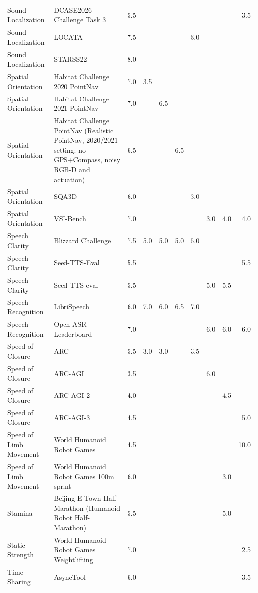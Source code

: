 \begin{longtable}{lp{4.6cm}rrrrrrrr}
Sound Localization & DCASE2026 Challenge Task 3 & 5.5 &  &  &  &  &  &  & 3.5 \\
Sound Localization & LOCATA & 7.5 &  &  &  & 8.0 &  &  &  \\
Sound Localization & STARSS22 & 8.0 &  &  &  &  &  &  &  \\
Spatial Orientation & Habitat Challenge 2020 PointNav & 7.0 & 3.5 &  &  &  &  &  &  \\
Spatial Orientation & Habitat Challenge 2021 PointNav & 7.0 &  & 6.5 &  &  &  &  &  \\
Spatial Orientation & Habitat Challenge PointNav (Realistic PointNav, 2020/2021 setting: no GPS+Compass, noisy RGB-D and actuation) & 6.5 &  &  & 6.5 &  &  &  &  \\
Spatial Orientation & SQA3D & 6.0 &  &  &  & 3.0 &  &  &  \\
Spatial Orientation & VSI-Bench & 7.0 &  &  &  &  & 3.0 & 4.0 & 4.0 \\
Speech Clarity & Blizzard Challenge & 7.5 & 5.0 & 5.0 & 5.0 & 5.0 &  &  &  \\
Speech Clarity & Seed-TTS-Eval & 5.5 &  &  &  &  &  &  & 5.5 \\
Speech Clarity & Seed-TTS-eval & 5.5 &  &  &  &  & 5.0 & 5.5 &  \\
Speech Recognition & LibriSpeech & 6.0 & 7.0 & 6.0 & 6.5 & 7.0 &  &  &  \\
Speech Recognition & Open ASR Leaderboard & 7.0 &  &  &  &  & 6.0 & 6.0 & 6.0 \\
Speed of Closure & ARC & 5.5 & 3.0 & 3.0 &  & 3.5 &  &  &  \\
Speed of Closure & ARC-AGI & 3.5 &  &  &  &  & 6.0 &  &  \\
Speed of Closure & ARC-AGI-2 & 4.0 &  &  &  &  &  & 4.5 &  \\
Speed of Closure & ARC-AGI-3 & 4.5 &  &  &  &  &  &  & 5.0 \\
Speed of Limb Movement & World Humanoid Robot Games & 4.5 &  &  &  &  &  &  & 10.0 \\
Speed of Limb Movement & World Humanoid Robot Games 100m sprint & 6.0 &  &  &  &  &  & 3.0 &  \\
Stamina & Beijing E-Town Half-Marathon (Humanoid Robot Half-Marathon) & 5.5 &  &  &  &  &  & 5.0 &  \\
Static Strength & World Humanoid Robot Games Weightlifting & 7.0 &  &  &  &  &  &  & 2.5 \\
Time Sharing & AsyncTool & 6.0 &  &  &  &  &  &  & 3.5 \\

\end{longtable}
